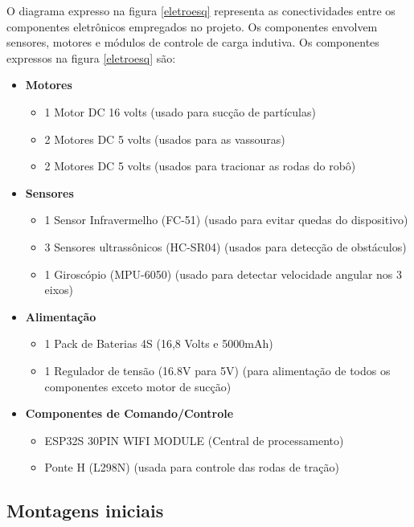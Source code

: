 O diagrama expresso na figura \ref{eletroesq} representa as conectividades entre os componentes eletrônicos empregados no projeto. Os componentes envolvem sensores, motores e módulos de controle de carga indutiva. Os componentes expressos na figura \ref{eletroesq} são:
\begin{itemize}
    \item \textbf{Motores}
    \begin{itemize}
    \item 1 Motor DC 16 volts (usado para sucção de partículas)
    \item 2 Motores DC 5 volts (usados para as vassouras)
    \item 2 Motores DC 5 volts (usados para tracionar as rodas do robô)
    \end{itemize}
    
    \item \textbf{Sensores}
\begin{itemize}
    \item 1 Sensor Infravermelho (FC-51) (usado para evitar quedas do dispositivo)
    \item 3 Sensores ultrassônicos (HC-SR04) (usados para detecção de obstáculos)
    \item 1 Giroscópio (MPU-6050) (usado para detectar velocidade angular nos 3 eixos)
\end{itemize}
    \item \textbf{Alimentação}
\begin{itemize}
    \item 1 Pack de Baterias 4S (16,8 Volts e 5000mAh)
    \item 1 Regulador de tensão (16.8V para 5V) (para alimentação de todos os componentes exceto motor de sucção)
\end{itemize}
    \item \textbf{Componentes de Comando/Controle}
\begin{itemize}
    \item ESP32S 30PIN WIFI MODULE (Central de processamento)
    \item Ponte H (L298N) (usada para controle das rodas de tração)
\end{itemize}    
\end{itemize}


\subsection{Montagens iniciais}

